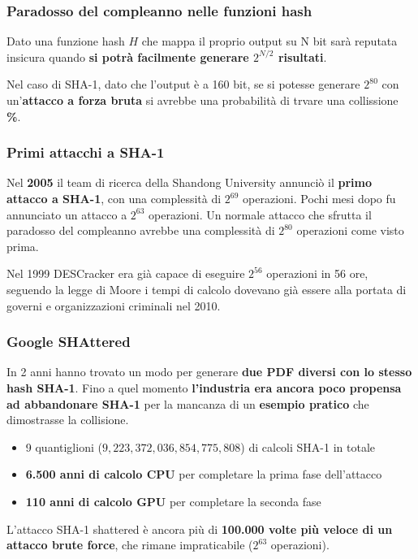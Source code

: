 \begin{frame}
\frametitle{Paradosso del compleanno nelle funzioni hash}

Dato una funzione hash \(H\) che mappa il proprio output su N bit sarà reputata insicura quando \textbf{si potrà facilmente generare $2^{N/2}$ risultati}.

\vspace{1cm}

Nel caso di SHA-1, dato che l'output è a 160 bit, se si potesse generare $2^{80}$ con un'\textbf{attacco a forza bruta} si avrebbe una probabilità di trvare una collissione \textbf{\%}.
\end{frame}


\begin{frame}
\frametitle{Primi attacchi a SHA-1}
Nel \textbf{2005} il team di ricerca della Shandong University annunciò il \textbf{primo attacco a SHA-1}, con una complessità di \(2^{69}\) operazioni. 
Pochi mesi dopo fu annunciato un attacco a \(2^{63}\) operazioni.
Un normale attacco che sfrutta il paradosso del compleanno avrebbe una complessità di \(2^{80}\) operazioni come visto prima.

\vspace{1cm}

Nel 1999 DESCracker era già capace di eseguire \(2^{56}\) operazioni in 56 ore, seguendo la legge di Moore i tempi di calcolo dovevano già essere alla portata di governi e organizzazioni criminali nel 2010.
\end{frame}


\begin{frame}
\frametitle{Google SHAttered}

In 2 anni hanno trovato un modo per generare \textbf{due PDF diversi con lo stesso hash SHA-1}.
Fino a quel momento \textbf{l'industria era ancora poco propensa ad abbandonare SHA-1} per la mancanza di un \textbf{esempio pratico} che dimostrasse la collisione.
\begin{itemize}
    \item 9 quantiglioni (\(9,223,372,036,854,775,808\)) di calcoli SHA-1 in totale
    \item \textbf{6.500 anni di calcolo CPU} per completare la prima fase dell'attacco
    \item \textbf{110 anni di calcolo GPU} per completare la seconda fase 
\end{itemize}

L'attacco SHA-1 shattered è ancora più di \textbf{100.000 volte più veloce di un attacco brute force}, che rimane impraticabile (\(2^{63}\) operazioni).
\end{frame}

